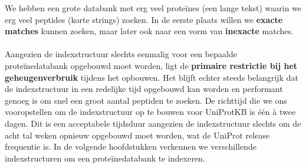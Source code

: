 We hebben een grote databank met erg veel proteïnes (een lange tekst) waarin we erg veel peptides (korte strings) zoeken.
In de eerste plaats willen we \textbf{exacte matches} kunnen zoeken, maar later ook naar een vorm van \textbf{inexacte} matches.
\\ \\
Aangezien de indexstructuur slechts eenmalig voor een bepaalde proteïnedatabank opgebouwd moet worden, ligt de \textbf{primaire restrictie bij het geheugenverbruik} tijdens het opbouwen.
Het blijft echter steeds belangrijk dat de indexstructuur in een redelijke tijd opgebouwd kan worden en performant genoeg is om snel een groot aantal peptiden te zoeken.
De richttijd die we ons vooropstellen om de indexstructuur op te bouwen voor UniProtKB is één à twee dagen.
Dit is een acceptabele tijdsduur aangezien de indexstructuur slechts om de acht tal weken opnieuw opgebouwd moet worden, wat de UniProt release frequentie is.
In de volgende hoofdstukken verkennen we verschillende indexstructuren om een proteïnedatabank te indexeren.


